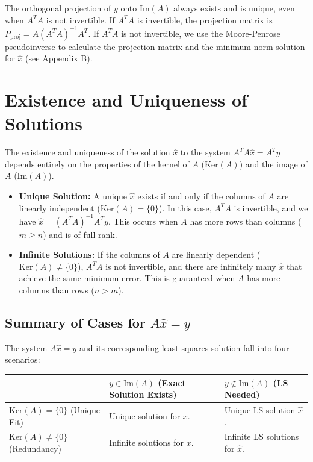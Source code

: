 \begin{notechapter}
The orthogonal projection of $y$ onto $\text{Im}(A)$ always exists and is unique, even when $A^TA$ is not invertible. If $A^TA$ is invertible, the projection matrix is $P_{\text{proj}} = A(A^TA)^{-1}A^T$. If $A^TA$ is not invertible, we use the Moore-Penrose pseudoinverse to calculate the projection matrix and the minimum-norm solution for $\hat{x}$ (see Appendix B).

\section{Existence and Uniqueness of Solutions}

The existence and uniqueness of the solution $\hat{x}$ to the system $A^TA\hat{x} = A^Ty$ depends entirely on the properties of the kernel of $A$ ($\text{Ker}(A)$) and the image of $A$ ($\text{Im}(A)$).

\begin{itemize}[leftmargin=*]
    \item \textbf{Unique Solution:} A unique $\hat{x}$ exists if and only if the columns of $A$ are linearly independent ($\text{Ker}(A) = \{0\}$). In this case, $A^TA$ is invertible, and we have $\hat{x} = (A^TA)^{-1}A^Ty$. This occurs when $A$ has more rows than columns ($m \geq n$) and is of full rank.
    \item \textbf{Infinite Solutions:} If the columns of $A$ are linearly dependent ($\text{Ker}(A) \neq \{0\}$), $A^TA$ is not invertible, and there are infinitely many $\hat{x}$ that achieve the same minimum error. This is guaranteed when $A$ has more columns than rows ($n > m$).
\end{itemize}

\subsection*{Summary of Cases for $A\hat{x}=y$}
The system $A\hat{x}=y$ and its corresponding least squares solution fall into four scenarios:

\begin{table}[h!]
    \centering
    \begin{tabular}{|l|l|l|}
    \hline
    & $y \in \text{Im}(A)$ (Exact Solution Exists) & $y \notin \text{Im}(A)$ (LS Needed) \\
    \hline
    $\text{Ker}(A) = \{0\}$ (Unique Fit) & Unique solution for $x$. & Unique LS solution $\hat{x}$. \\
    \hline
    $\text{Ker}(A) \neq \{0\}$ (Redundancy) & Infinite solutions for $x$. & Infinite LS solutions for $\hat{x}$. \\
    \hline
    \end{tabular}
\end{table}


\end{notechapter}
